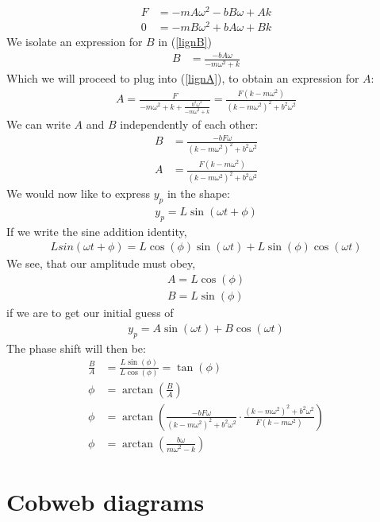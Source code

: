 \documentclass[12pt,oneside,a4paper]{article}
\numberwithin{equation}{section}
\begin{document}
{{{{\begin{align}
F &= -mA\omega^2 -bB\omega + Ak \label{lignA} \\ 
0 &= -mB\omega^2 + bA\omega + Bk \label{lignB}
\end{align}
We isolate an expression for $B$ in (\ref{lignB})
\begin{align*}
B &= \frac{-bA\omega}{-m\omega^2+k}
\end{align*}
Which we will proceed to plug into (\ref{lignA}), to obtain an expression for $A$:
\begin{align*}
A = \frac{F}{-m\omega^2+k+\frac{b^2\omega^2}{-m\omega^2+k}} = \frac{F\left(k-m\omega^2\right)}{\left(k-m\omega^2\right)^2+b^2\omega^2}
\end{align*} 
We can write $A$ and $B$ independently of each other:
\begin{align*}
B &= \frac{-bF\omega}{\left(k-m\omega^2\right)^2+b^2\omega^2}\\
A &=  \frac{F\left(k-m\omega^2\right)}{\left(k-m\omega^2\right)^2+b^2\omega^2}
\end{align*}
We would now like to express $y_p$ in the shape:
\begin{align*}
y_p = L \sin(\omega t + \phi)
\end{align*}
If we write the sine addition identity,
\begin{align*}
L sin(\omega t + \phi) = L\cos(\phi)\sin(\omega t) + L\sin(\phi)\cos(\omega t)
\end{align*}
We see, that our amplitude must obey,
\begin{align*}
A = L\cos(\phi)\\
B = L\sin(\phi)
\end{align*}
if we are to get our initial guess of
\begin{align*}
y_p = A \sin (\omega t) + B \cos(\omega t)
\end{align*}
The phase shift will then be:
\begin{align*}
\frac{B}{A} &= \frac{L\sin(\phi)}{L\cos(\phi)} = \tan(\phi)\\
\phi &= \arctan\left(\frac{B}{A}\right)\\
\phi &= \arctan\left( \frac{-bF\omega}{\left(k-m\omega^2\right)^2+b^2\omega^2} \cdot \frac{\left(k-m\omega^2\right)^2+b^2\omega^2}{F\left(k-m\omega^2\right)} \right)\\
\phi &= \arctan\left( \frac{b\omega}{m\omega^2-k} \right)
\end{align*}

\section{Cobweb diagrams}

}}}}
\end{document}

